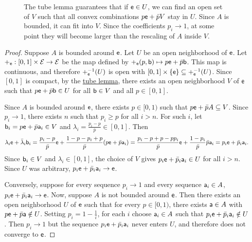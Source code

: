 \begin{mathSection}
\begin{figure}[H]
		\caption{The tube lemma guarantees that if $\ens \in U$, we can find an open set of $V$ such that all convex combinations $p \ens + \bar{p} V$ stay in $U$. Since $A$ is bounded, it can fit into $V$. Since the coefficients $p_i \to 1$, at some point they will become larger than the rescaling of $A$ inside $V$.}
	\end{figure}
	
	\begin{proof}
		Suppose $A$ is bounded around $\ens$. Let $U$ be an open neighborhood of $\ens$. Let $+_{\ens} : [0,1] \times \Ens \to \Ens$ be the map defined by $+_{\ens}(p, \ens[b]) \mapsto p \ens + \bar{p} \ens[b]$. This map is continuous, and therefore $+_{\ens}^{-1}(U)$ is open with $[0,1]\times\{\ens[e]\} \subseteq +_{\ens}^{-1}(U)$. Since $[0,1]$ is compact, by the \href{https://en.wikipedia.org/wiki/Tube_lemma}{tube lemma}, there exists an open neighborhood $V$ of $\ens$ such that $p \ens + \bar{p} \ens[b] \in U$ for all $\ens[b] \in V$ and all $p \in [0,1]$.
		
		Since $A$ is bounded around $\ens$, there exists $p \in [0,1)$ such that $p\ens + \bar{p}A \subseteq V$. Since $p_i \to 1$, there exists $n$ such that $p_i \geq p$ for all $i > n$. For such $i$, let $\ens[b]_i = p\ens + \bar{p}\ens[a]_i \in V$ and $\lambda_i = \frac{p_i - p}{\bar{p}} \in [0,1]$. Then
		\begin{equation}
			\lambda_i \ens + \bar{\lambda}_i \ens[b]_i = \frac{p_i - p}{\bar{p}} \ens + \frac{1 - p - p_i + p}{\bar{p}} (p\ens + \bar{p}\ens[a]_i) = \frac{p_i - p + p - p p_i}{\bar{p}} \ens + \frac{1 - p_i}{\bar{p}} \bar{p} \ens[a]_i = p_i \ens + \bar{p}_i \ens[a]_i.
		\end{equation}
		Since $\ens[b]_i \in V$ and $\lambda_i \in [0,1]$, the choice of $V$ gives $p_i \ens + \bar{p}_i \ens[a]_i \in U$ for all $i > n$. Since $U$ was arbitrary, $p_i \ens + \bar{p}_i \ens[a]_i \to \ens$.
		
		Conversely, suppose for every sequence $p_i \to 1$ and every sequence $\ens[a]_i \in A$, $p_i \ens + \bar{p}_i \ens[a]_i \to \ens[e]$. Now, suppose $A$ is not bounded around $\ens$. Then there exists an open neighborhood $U$ of $\ens$ such that for every $p \in [0,1)$, there exists $\ens[a] \in A$ with $p\ens + \bar{p}\ens[a] \notin U$. Setting $p_i = 1 - \frac{1}{i}$, for each $i$ choose $\ens[a]_i \in A$ such that $p_i\ens + \bar{p}_i\ens[a]_i \notin U$. Then $p_i \to 1$ but the sequence $p_i\ens + \bar{p}_i\ens[a]_i$ never enters $U$, and therefore does not converge to $\ens$.
	\end{proof}
\end{mathSection}

